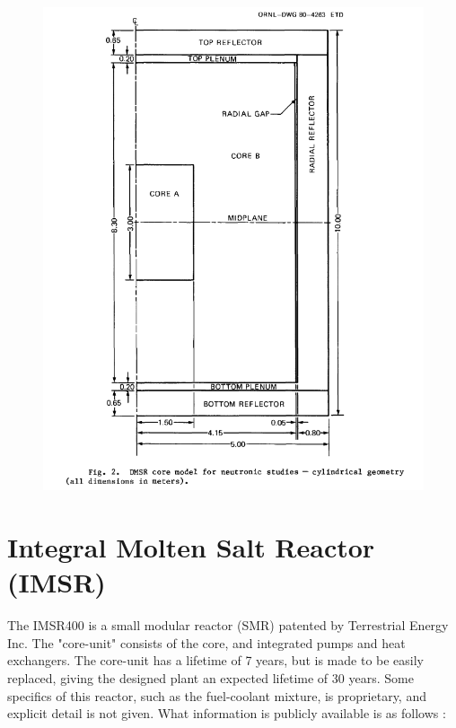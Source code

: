 \documentclass[letterpaper]{article}
\begin{document}
\begin{figure}[H]
  \centering
  \includegraphics[width=1.0\linewidth]{figures/DMSRsource1.png}
  \label{fig:fig7}
\end{figure}

\section{Integral Molten Salt Reactor (IMSR)}

The IMSR400 is a small modular reactor (SMR) patented by Terrestrial Energy Inc.  The "core-unit" consists of the core, and integrated pumps and heat exchangers.  The core-unit has a lifetime of 7 years, but is made to be easily replaced, giving the designed plant an expected lifetime of 30 years.  Some specifics of this reactor, such as the fuel-coolant mixture, is proprietary, and explicit detail is not given.  What information is publicly available is as follows \cite{leblanc_18_2017}:
\end{document}

